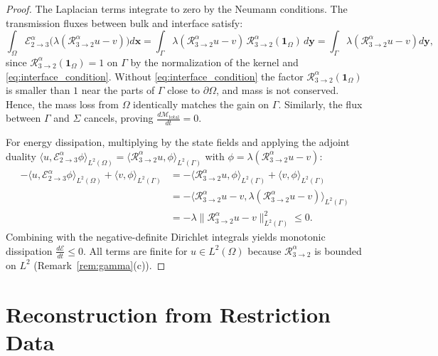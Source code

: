 \documentclass[11pt,a4paper]{article}
\theoremstyle{plain}
\theoremstyle{definition}
\theoremstyle{remark}
\numberwithin{equation}{section}
\begin{document}
\begin{proof}
The Laplacian terms integrate to zero by the Neumann conditions. The transmission fluxes between bulk and interface satisfy:
\begin{equation}
\int_\Omega \mathcal{E}_{2 \to 3}^\alpha \big(\lambda (\mathcal{R}_{3 \to 2}^\alpha u - v)\big) d\mathbf{x} = \int_\Gamma \lambda (\mathcal{R}_{3 \to 2}^\alpha u - v)\, \mathcal{R}_{3 \to 2}^\alpha(\mathbf{1}_\Omega)\, d\mathbf{y} = \int_\Gamma \lambda (\mathcal{R}_{3 \to 2}^\alpha u - v) d\mathbf{y},
\end{equation}
since $\mathcal{R}_{3 \to 2}^\alpha(\mathbf{1}_\Omega) = 1$ on $\Gamma$ by the normalization of the kernel and \eqref{eq:interface_condition}. Without \eqref{eq:interface_condition} the factor $\mathcal{R}_{3 \to 2}^\alpha(\mathbf{1}_\Omega)$ is smaller than $1$ near the parts of $\Gamma$ close to $\partial\Omega$, and mass is not conserved. Hence, the mass loss from $\Omega$ identically matches the gain on $\Gamma$. Similarly, the flux between $\Gamma$ and $\Sigma$ cancels, proving $\frac{d\mathcal{M}_{\text{total}}}{dt} = 0$.

For energy dissipation, multiplying by the state fields and applying the adjoint duality $\langle u, \mathcal{E}_{2 \to 3}^\alpha \phi \rangle_{L^2(\Omega)} = \langle \mathcal{R}_{3 \to 2}^\alpha u, \phi \rangle_{L^2(\Gamma)}$ with $\phi = \lambda(\mathcal{R}_{3 \to 2}^\alpha u - v)$:
\begin{align*}
-\langle u, \mathcal{E}_{2 \to 3}^\alpha \phi \rangle_{L^2(\Omega)} + \langle v, \phi \rangle_{L^2(\Gamma)} &= -\langle \mathcal{R}_{3 \to 2}^\alpha u, \phi \rangle_{L^2(\Gamma)} + \langle v, \phi \rangle_{L^2(\Gamma)} \\
&= -\langle \mathcal{R}_{3 \to 2}^\alpha u - v, \lambda(\mathcal{R}_{3 \to 2}^\alpha u - v) \rangle_{L^2(\Gamma)} \\
&= -\lambda \|\mathcal{R}_{3 \to 2}^\alpha u - v\|_{L^2(\Gamma)}^2 \le 0.
\end{align*}
Combining with the negative-definite Dirichlet integrals yields monotonic dissipation $\frac{d\mathcal{E}}{dt} \le 0$. All terms are finite for $u \in L^2(\Omega)$ because $\mathcal{R}^\alpha_{3\to 2}$ is bounded on $L^2$ (Remark~\ref{rem:gamma}(c)).
\end{proof}

\section{Reconstruction from Restriction Data}
\end{document}
